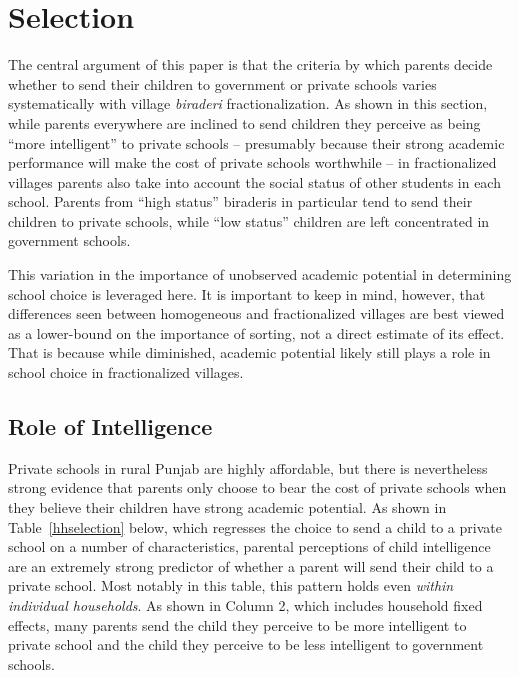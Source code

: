 \documentclass[12pt]{article}
\begin{document}




\section{Selection}\label{selection}

The central argument of this paper is that the criteria by which parents decide whether to send their children to government or private schools varies systematically with village \emph{biraderi} fractionalization. As shown in this section, while parents everywhere are inclined to send children they perceive as being ``more intelligent'' to private schools -- presumably because their strong academic performance will make the cost of private schools worthwhile -- in fractionalized villages parents also take into account the social status of other students in each school. Parents from ``high status'' biraderis in particular tend to send their children to private schools, while ``low status'' children are left concentrated in government schools. 

This variation in the importance of unobserved academic potential in determining school choice is leveraged here. It is important to keep in mind, however, that differences seen between homogeneous and fractionalized villages are best viewed as a lower-bound on the importance of sorting, not a direct estimate of its effect. That is because while diminished, academic potential likely still plays a role in school choice in fractionalized villages. 


\subsection{Role of Intelligence}\label{}

Private schools in rural Punjab are highly affordable, but there is nevertheless strong evidence that parents only choose to bear the cost of private schools when they believe their children have strong academic potential. As shown in Table~\ref{hhselection} below, which regresses the choice to send a child to a private school on a number of characteristics, parental perceptions of child intelligence are an extremely strong predictor of whether a parent will send their child to a private school. Most notably in this table, this pattern holds even \emph{within individual households}. As shown in Column 2, which includes household fixed effects, many parents send the child they perceive to be more intelligent to private school and the child they perceive to be less intelligent to government schools. 
\end{document}

